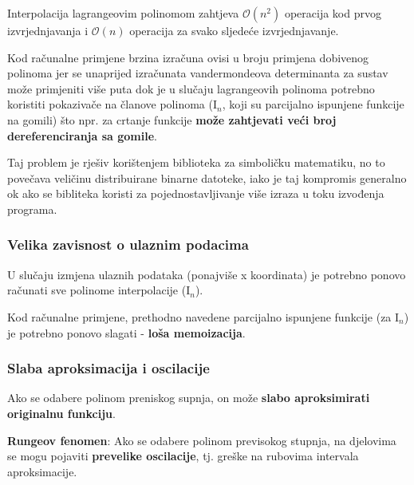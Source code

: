 Interpolacija lagrangeovim polinomom zahtjeva $\mathcal{O}(n^2)$ operacija kod prvog izvrjednjavanja i $\mathcal{O}(n)$ operacija za svako sljedeće izvrjednjavanje.

Kod računalne primjene brzina izračuna ovisi u broju primjena dobivenog polinoma jer se unaprijed izračunata vandermondeova determinanta za sustav može primjeniti više puta dok je u slučaju lagrangeovih polinoma potrebno koristiti pokazivače na članove polinoma ($\mathrm{I}_n$, koji su parcijalno ispunjene funkcije na gomili) što npr. za crtanje funkcije \textbf{može zahtjevati veći broj dereferenciranja sa gomile}.

Taj problem je rješiv korištenjem biblioteka za simboličku matematiku, no to povečava veličinu distribuirane binarne datoteke, iako je taj kompromis generalno ok ako se bibliteka koristi za pojednostavljivanje više izraza u toku izvođenja programa.

\subsubsection{Velika zavisnost o ulaznim podacima}

U slučaju izmjena ulaznih podataka (ponajviše x koordinata) je potrebno ponovo računati sve polinome interpolacije ($\mathrm{I}_n$).

Kod računalne primjene, prethodno navedene parcijalno ispunjene funkcije (za $\mathrm{I}_n$) je potrebno ponovo slagati - \textbf{loša memoizacija}.

\subsubsection{Slaba aproksimacija i oscilacije}

Ako se odabere polinom preniskog supnja, on može \textbf{slabo aproksimirati originalnu funkciju}.

\textbf{Rungeov fenomen}: Ako se odabere polinom previsokog stupnja, na djelovima se mogu pojaviti \textbf{prevelike oscilacije}, tj. greške na rubovima intervala aproksimacije.
